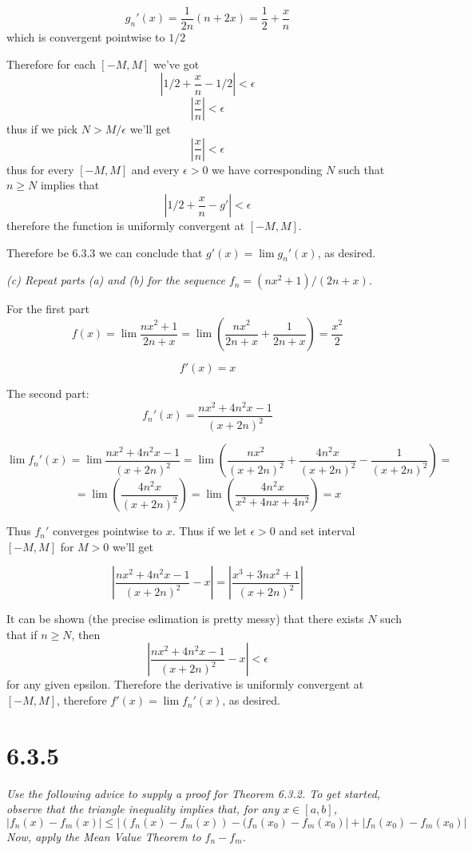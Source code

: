 \documentclass[11pt,oneside,titlepage]{book}
\begin{document}
$$g_n'(x) = \frac{1}{2n}(n + 2x) = \frac{1}{2} + \frac{x}{n}$$
which is convergent pointwise to $1/2$

Therefore for each $[-M, M]$ we've got
$$|1/2 + \frac{x}{n} - 1/2| < \epsilon$$
$$| \frac{x}{n} | < \epsilon$$
thus if we pick $N > M/\epsilon$ we'll get
$$| \frac{x}{n} | < \epsilon$$
thus for every $[-M, M]$ and every $\epsilon > 0$ we have corresponding $N$
such that $n \geq N$ implies that
$$|1/2 + \frac{x}{n} - g'| < \epsilon$$
therefore the function is uniformly convergent at $[-M, M]$.

Therefore be 6.3.3 we can conclude that $g'(x) = \lim g_n'(x)$, as desired.

\textit{(c) Repeat parts (a) and (b) for the sequence
  $f_n = (nx^2 + 1)/(2n + x)$.}

For the first part
$$f(x) = \lim{\frac{nx^2 + 1}{2n + x}} =
\lim{\left(\frac{nx^2}{2n + x} + \frac{1}{2n + x}\right)}
= \frac{x^2}{2}
$$

$$f'(x) = x$$

The second part:
$$f_n'(x) = \frac{nx^2 + 4n^2x - 1}{(x + 2n)^2}$$

$$\lim{f_n'(x)} = \lim{\frac{nx^2 + 4n^2x - 1}{(x + 2n)^2}} =
\lim{\left(\frac{nx^2}{(x + 2n)^2} +
    \frac{4n^2x}{(x + 2n)^2} - \frac{1}{(x + 2n)^2}\right)} =
$$
$$
=
\lim{\left(\frac{4n^2x}{(x + 2n)^2}\right)} =
\lim{\left(\frac{4n^2x}{x^2 + 4nx + 4n^2}\right)} =
x
$$

Thus $f_n'$ converges pointwise to $x$. Thus if we let $\epsilon > 0$
and set interval $[-M, M]$ for $M > 0$ we'll get

$$|\frac{nx^2 + 4n^2x - 1}{(x + 2n)^2} - x| =
|\frac{x^3 + 3nx^2 + 1}{(x + 2n)^2}| 
$$

It can be shown (the precise eslimation is pretty messy) that there exists
$N$ such that if $n \geq N$, then
$$|\frac{nx^2 + 4n^2x - 1}{(x + 2n)^2} - x| < \epsilon$$
for any given epsilon. Therefore the derivative is uniformly convergent at
$[-M, M]$, therefore $f'(x) = \lim f_n'(x)$, as desired.

\section*{6.3.5}
\textit{Use the following advice to supply a proof for Theorem 6.3.2. To get
  started, observe that the triangle inequality implies that, for any
  $x \in [a, b]$,}
$$|f_n(x) - f_m(x)| \leq |(f_n(x) - f_m(x)) - (f_n(x_0) - f_m(x_0)| +
|f_n(x_0) - f_m(x_0)|$$
\textit{Now, apply the Mean Value Theorem to $f_n - f_m$.}
\end{document}
